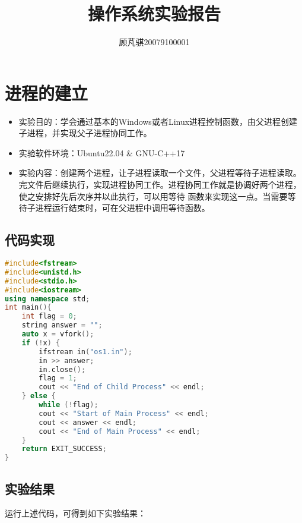 \documentclass[UTF8]{ctexart}
\title{操作系统实验报告}
\author{顾芃骐20079100001}
\begin{document}
	\maketitle
	\newpage
	\section{进程的建立}
	\begin{itemize}
		\item 实验目的：学会通过基本的Windows或者Linux进程控制函数，由父进程创建子进程，并实现父子进程协同工作。
		\item 实验软件环境：Ubuntu22.04 \& GNU-C++17
		\item 实验内容：创建两个进程，让子进程读取一个文件，父进程等待子进程读取。完文件后继续执行，实现进程协同工作。进程协同工作就是协调好两个进程，使之安排好先后次序并以此执行，可以用等待 函数来实现这一点。当需要等待子进程运行结束时，可在父进程中调用等待函数。
	\end{itemize}
	\subsection{代码实现}
\begin{lstlisting}[language=c++]
#include<fstream>
#include<unistd.h>
#include<stdio.h>
#include<iostream>
using namespace std;
int main(){
	int flag = 0;
	string answer = "";
	auto x = vfork();
	if (!x) {
		ifstream in("os1.in");
		in >> answer;
		in.close();
		flag = 1;
		cout << "End of Child Process" << endl;
	} else {
		while (!flag);
		cout << "Start of Main Process" << endl;
		cout << answer << endl;
		cout << "End of Main Process" << endl;
	}
	return EXIT_SUCCESS;
}
\end{lstlisting}
\subsection{实验结果}
运行上述代码，可得到如下实验结果：
\end{document}
